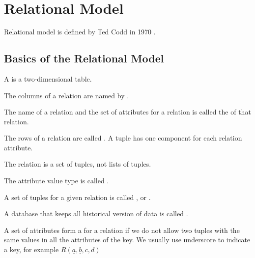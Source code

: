 \section{Relational Model}

Relational model is defined by Ted Codd in 1970 \cite{Codd1983a}.

\subsection{Basics of the Relational Model}

\begin{definition}
    A  is a two-dimensional table.
\end{definition}

\begin{definition}
    The columns of a relation are named by .
\end{definition}

\begin{definition}
    The name of a relation and the set of attributes for a relation is called the  of that relation.
\end{definition}

\begin{definition}
    The rows of a relation are called . A tuple has one component for each relation attribute.
\end{definition}

The relation is a set of tuples, not lists of tuples.

\begin{definition}
    The attribute value type is called .
\end{definition}

\begin{definition}
    A set of tuples for a given relation is called , or .
\end{definition}

\begin{definition}
    A database that keeps all historical version of data is called .
\end{definition}

\begin{definition}
    A set of attributes form a  for a relation if we do not allow two tuples with the same values in all the attributes of the key. We usually use underscore to indicate a key, for example $R(\underline{a},\underline{b},c,d)$
\end{definition}



